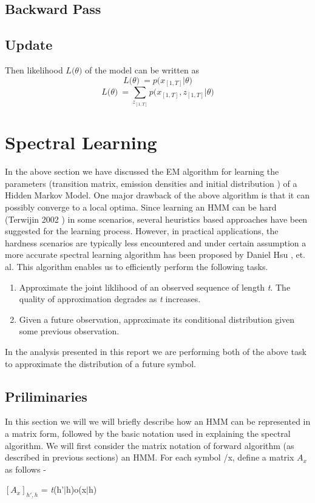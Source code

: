 \documentclass{article} %
\begin{document}
\subsection*{Backward Pass}

\subsection*{Update}

Then likelihood \(L\big(\theta\big)\) of the model can be written as 
\[L\big(\theta \big)\ = p\big(x_{[1,T]}|\theta \big) \]
\[L\big(\theta \big)\ = \sum_{z_{[1,T]}} p\big(x_{[1,T]},z_{[1,T]}|\theta \big) \]



\section{Spectral Learning}
\label{Spectral Learning}

In the above section we have discussed the EM algorithm for learning the parameters (transition matrix, emission densities and initial distribution ) of a Hidden Markov Model. One major drawback of the above algorithm is that it can possibly converge to a local optima. Since learning an HMM can be hard (Terwijin 2002 ) in some scenarios, several heuristics based approaches have been suggested for the learning process. However, in practical applications, the hardness scenarios are typically less encountered and under certain assumption a more accurate spectral learning algorithm has been proposed by Daniel Hsu , et. al.  This algorithm enables us to efficiently perform the following tasks.
\begin{enumerate}
	\item Approximate the joint liklihood of an observed sequence of length \textit{t}. The quality of approximation degrades as \textit{t} increases.
	\item Given a future observation, approximate its conditional distribution given some previous observation. 
\end{enumerate}
In the analysis presented in this report we are performing both of the above task to approximate the distribution of a future symbol.
\subsection{Priliminaries}
In this section we will we will briefly describe how an HMM can be represented in a matrix form, followed by the basic notation used in explaining the spectral algorithm. 
\newline
We will first consider the matrix notation of forward algorithm (as described in previous sections) an HMM. For each symbol /x, define a matrix $A_x$ as follows -
\begin{center}
$[A_x]_{h',h}$ = \textit{t}(h'$\vert$h)o(x$\vert$h) 
\end{center}
 
\end{document}
